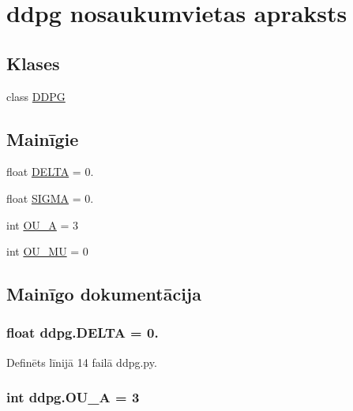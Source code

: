 \hypertarget{namespaceddpg}{}\section{ddpg nosaukumvietas apraksts}
\label{namespaceddpg}
\subsection*{Klases}
\begin{DoxyCompactItemize}
\item 
class \hyperlink{classddpg_1_1_d_d_p_g}{D\+D\+PG}
\end{DoxyCompactItemize}
\subsection*{Mainīgie}
\begin{DoxyCompactItemize}
\item 
float \hyperlink{namespaceddpg_a94848439d7aad5c0a6ddda045d7cedb3}{D\+E\+L\+TA} = 0.
\item 
float \hyperlink{namespaceddpg_ad1dc6fdac61935bbb2a7b9772456659e}{S\+I\+G\+MA} = 0.
\item 
int \hyperlink{namespaceddpg_afd2b449e18dd399bcc44f9182178c6ec}{O\+U\+\_\+A} = 3
\item 
int \hyperlink{namespaceddpg_a53de24d0b96144658853500fe6fbfb5e}{O\+U\+\_\+\+MU} = 0
\end{DoxyCompactItemize}


\subsection{Mainīgo dokumentācija}
\subsubsection[{\texorpdfstring{D\+E\+L\+TA}{DELTA}}]{\setlength{\rightskip}{0pt plus 5cm}float ddpg.\+D\+E\+L\+TA = 0.}\hypertarget{namespaceddpg_a94848439d7aad5c0a6ddda045d7cedb3}{}\label{namespaceddpg_a94848439d7aad5c0a6ddda045d7cedb3}


Definēts līnijā 14 failā ddpg.\+py.

\subsubsection[{\texorpdfstring{O\+U\+\_\+A}{OU_A}}]{\setlength{\rightskip}{0pt plus 5cm}int ddpg.\+O\+U\+\_\+A = 3}\hypertarget{namespaceddpg_afd2b449e18dd399bcc44f9182178c6ec}{}\label{namespaceddpg_afd2b449e18dd399bcc44f9182178c6ec}



